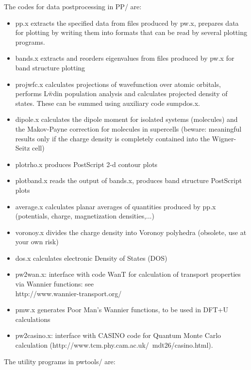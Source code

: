 \documentclass[12pt,a4paper]{article}
\begin{document}
The codes for data postprocessing in PP/ are:
\begin{itemize}
\item pp.x extracts the specified data from files produced by pw.x,
  prepares data for plotting by writing them into formats that can be
  read by several plotting programs. 
\item bands.x extracts and reorders eigenvalues from files produced by
  pw.x for band structure plotting 
\item projwfc.x calculates projections of wavefunction over atomic
  orbitals, performs L\"wdin population analysis and calculates
  projected density of states. These can be summed using auxiliary
  code sumpdos.x. 
\item dipole.x calculates the dipole moment for isolated systems
  (molecules) and the Makov-Payne correction for molecules in
  supercells (beware: meaningful results only if the charge density is
  completely contained into the Wigner-Seitz cell) 
\item plotrho.x produces PostScript 2-d contour plots
\item plotband.x reads the output of bands.x, produces band structure
  PostScript plots
\item average.x calculates planar averages of quantities produced by
  pp.x (potentials, charge, magnetization densities,...) 
\item voronoy.x divides the charge density into Voronoy polyhedra
  (obsolete, use at your own risk) 
\item dos.x calculates electronic Density of States (DOS)
\item pw2wan.x: interface with code WanT for calculation of transport
  properties via Wannier functions: see \\
  http://www.wannier-transport.org/ 
\item pmw.x generates Poor Man's Wannier functions, to be used in
  DFT+U calculations 
\item pw2casino.x: interface with CASINO code for Quantum Monte Carlo
  calculation (http://www.tcm.phy.cam.ac.uk/~mdt26/casino.html). 
\end{itemize}
The utility programs in pwtools/ are:
\end{document}
